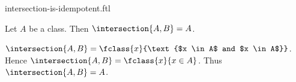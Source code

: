 \documentclass{article}
\begin{document}
\begin{smodule}[creators={Marcel Schütz}]{intersection-is-idempotent.ftl}

  \begin{fproposition*}[label=5333724497444864]
    Let $A$ be a class.
    Then $\intersection{A,B} = A$.
  \end{fproposition*}
  \begin{fproof}
    $\intersection{A,B} = \fclass{x}{\text{$x \in A$ and $x \in A$}}$.
    Hence $\intersection{A,B} = \fclass{x}{x \in A}$.
    Thus $\intersection{A,B} = A$.
  \end{fproof}
\end{smodule}
\end{document}
